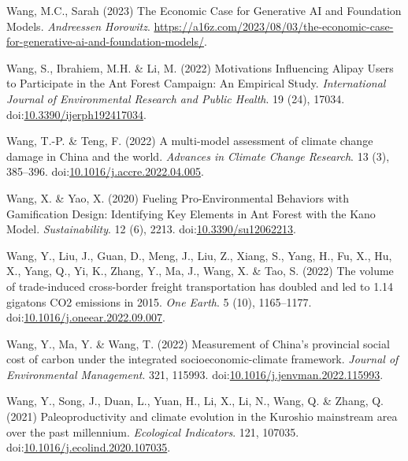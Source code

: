 \documentclass[
  letterpaper,
  DIV=11,
  numbers=noendperiod]{scrartcl}
\newlength{\cslhangindent}
\newenvironment{CSLReferences}[2] %
 {\begin{list}{}{%
  \setlength{\itemindent}{0pt}
  \setlength{\leftmargin}{0pt}
  \setlength{\parsep}{0pt}
  \ifodd #1
   \setlength{\leftmargin}{\cslhangindent}
   \setlength{\itemindent}{-1\cslhangindent}
  \fi
  \setlength{\itemsep}{#2\baselineskip}}}
 {\end{list}}
\begin{document}
\begin{CSLReferences}{0}{1}
Wang, M.C., Sarah (2023) The {Economic Case} for {Generative AI} and
{Foundation Models}. \emph{Andreessen Horowitz}.
\url{https://a16z.com/2023/08/03/the-economic-case-for-generative-ai-and-foundation-models/}.

Wang, S., Ibrahiem, M.H. \& Li, M. (2022) Motivations {Influencing
Alipay Users} to {Participate} in the {Ant Forest Campaign}: {An
Empirical Study}. \emph{International Journal of Environmental Research
and Public Health}. 19 (24), 17034.
doi:\href{https://doi.org/10.3390/ijerph192417034}{10.3390/ijerph192417034}.

Wang, T.-P. \& Teng, F. (2022) A multi-model assessment of climate
change damage in {China} and the world. \emph{Advances in Climate Change
Research}. 13 (3), 385--396.
doi:\href{https://doi.org/10.1016/j.accre.2022.04.005}{10.1016/j.accre.2022.04.005}.

Wang, X. \& Yao, X. (2020) Fueling {Pro-Environmental Behaviors} with
{Gamification Design}: {Identifying Key Elements} in {Ant Forest} with
the {Kano Model}. \emph{Sustainability}. 12 (6), 2213.
doi:\href{https://doi.org/10.3390/su12062213}{10.3390/su12062213}.

Wang, Y., Liu, J., Guan, D., Meng, J., Liu, Z., Xiang, S., Yang, H., Fu,
X., Hu, X., Yang, Q., Yi, K., Zhang, Y., Ma, J., Wang, X. \& Tao, S.
(2022) The volume of trade-induced cross-border freight transportation
has doubled and led to 1.14 gigatons {CO2} emissions in 2015. \emph{One
Earth}. 5 (10), 1165--1177.
doi:\href{https://doi.org/10.1016/j.oneear.2022.09.007}{10.1016/j.oneear.2022.09.007}.

Wang, Y., Ma, Y. \& Wang, T. (2022) Measurement of {China}'s provincial
social cost of carbon under the integrated socioeconomic-climate
framework. \emph{Journal of Environmental Management}. 321, 115993.
doi:\href{https://doi.org/10.1016/j.jenvman.2022.115993}{10.1016/j.jenvman.2022.115993}.

Wang, Y., Song, J., Duan, L., Yuan, H., Li, X., Li, N., Wang, Q. \&
Zhang, Q. (2021) Paleoproductivity and climate evolution in the
{Kuroshio} mainstream area over the past millennium. \emph{Ecological
Indicators}. 121, 107035.
doi:\href{https://doi.org/10.1016/j.ecolind.2020.107035}{10.1016/j.ecolind.2020.107035}.


\end{CSLReferences}
\end{document}
